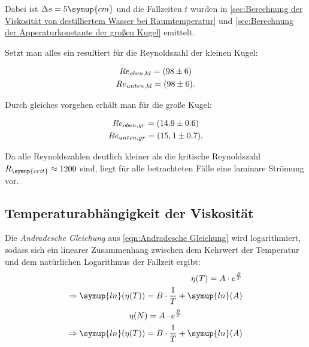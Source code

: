 Dabei ist $\Delta s=5\symup{cm}$ und die Fallzeiten $\overline{t}$ wurden in
\autoref{sec:Berechnung der Viskosität von destilliertem Wasser bei Raumtemperatur} und
\autoref{sec:Berechnung der Apperaturkonstante der großen Kugel} emittelt.

Setzt man alles ein resultiert für die Reynoldszahl der kleinen Kugel:

\begin{gather}
  Re_{oben,kl} = (98\pm6) \notag \\
  Re_{unten,kl} = (98\pm6) \notag .
\end{gather}

Durch gleiches vorgehen erhält man für die große Kugel:

\begin{gather}
  Re_{oben,gr} = (14.9\pm0.6) \notag \\
  Re_{unten,gr} = (15,1\pm0.7) \notag .
\end{gather}

Da alle Reynoldszahlen deutlich kleiner als die kritische Reynoldszahl $R_{\symup{crit}}\approx 1200$ sind, liegt für alle 
betrachteten Fälle eine laminare Strömung vor.

\subsection{Temperaturabhängigkeit der Viskosität}
\label{sec:Temperaturabhängigkeit der Viskosität}
Die \textit{Andradesche Gleichung} aus \autoref{eqn:Andradesche Gleichung} wird logarithmiert, sodass sich ein linearer Zusammenhang
zwischen dem Kehrwert der Temperatur und dem natürlichen Logarithmus der Fallzeit ergibt:
\begin{align}
  \eta (T)=A\cdot e^{\frac{B}{T}} \\
  \Rightarrow \symup{ln}(\eta(T)) = B \cdot \frac{1}{T} + \symup{ln}(A) 
\end{align}
\begin{gather}
  \eta (N)=A\cdot e^{\frac{B}{T}} \\
  \Rightarrow \symup{ln}(\eta(T)) = B \cdot \frac{1}{T} + \symup{ln}(A) 
\end{gather}

